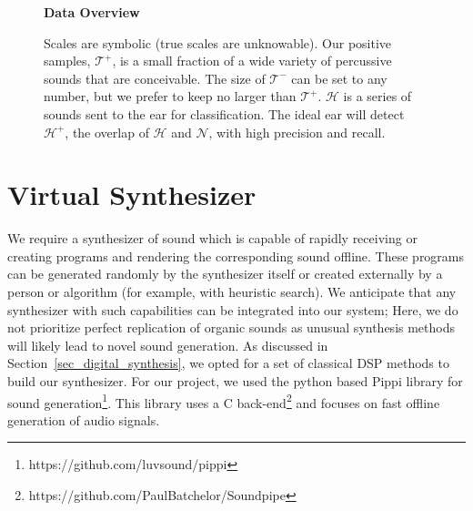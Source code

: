 \documentclass[\main/thesis.tex]{subfiles}
\begin{document}
\begin{figure}[t!]
    \begin{center}
    \textbf{Data Overview}
    \end{center}
    \caption{ 
    Scales are symbolic (true scales are unknowable). Our positive samples, $\mathcal{T^{+}}$, is a small fraction of a wide variety of percussive sounds that are conceivable. The size of $\mathcal{T^{-}}$ can be set to any number, but we prefer to keep no larger than  $\mathcal{T^{+}}$. $\mathcal{H}$ is a series of sounds sent to the ear for classification. The ideal ear will detect  $\mathcal{H^{+}}$, the overlap of $\mathcal{H}$ and $\mathcal{N}$, with high precision and recall. 
    }
\label{fig:ven_data}
\end{figure}

\section{Virtual Synthesizer}
\label{vs}
We require a synthesizer of sound which is capable of rapidly receiving or creating programs and rendering the corresponding sound offline. These programs can be generated randomly by the synthesizer itself or created externally by a person or algorithm (for example, with heuristic search).  We anticipate that any synthesizer with such capabilities can be integrated into our system; Here, we do not prioritize perfect replication of organic sounds as unusual synthesis methods will likely lead to novel sound generation. As discussed in Section~\ref{sec_digital_synthesis}, we opted for a set of classical DSP methods to build our synthesizer. For our project, we used the python based Pippi library for sound generation\footnote{https://github.com/luvsound/pippi}. This library uses a C back-end\footnote{https://github.com/PaulBatchelor/Soundpipe} and focuses on fast offline generation of audio signals.
\end{document}
